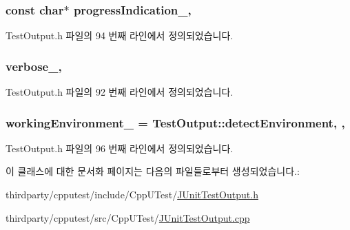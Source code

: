 \subsubsection[{\texorpdfstring{progress\+Indication\+\_\+}{progressIndication_}}]{\setlength{\rightskip}{0pt plus 5cm}const char$\ast$ progress\+Indication\+\_\+\hspace{0.3cm}{\ttfamily [protected]}, {\ttfamily [inherited]}}\hypertarget{class_test_output_a4cbc8ea3886624399ab3879767d4f018}{}\label{class_test_output_a4cbc8ea3886624399ab3879767d4f018}


Test\+Output.\+h 파일의 94 번째 라인에서 정의되었습니다.

\subsubsection[{\texorpdfstring{verbose\+\_\+}{verbose_}}]{ verbose\+\_\+\hspace{0.3cm}{\ttfamily [protected]}, {\ttfamily [inherited]}}\hypertarget{class_test_output_a86126da532c138842a42d8e9a52b0806}{}\label{class_test_output_a86126da532c138842a42d8e9a52b0806}


Test\+Output.\+h 파일의 92 번째 라인에서 정의되었습니다.

\subsubsection[{\texorpdfstring{working\+Environment\+\_\+}{workingEnvironment_}}]{ working\+Environment\+\_\+ = {\bf Test\+Output\+::detect\+Environment}\hspace{0.3cm}{\ttfamily [static]}, {\ttfamily [protected]}, {\ttfamily [inherited]}}\hypertarget{class_test_output_a8b622cfce4b95599cd31b61a777d68ef}{}\label{class_test_output_a8b622cfce4b95599cd31b61a777d68ef}


Test\+Output.\+h 파일의 96 번째 라인에서 정의되었습니다.



이 클래스에 대한 문서화 페이지는 다음의 파일들로부터 생성되었습니다.\+:\begin{DoxyCompactItemize}
\item 
thirdparty/cpputest/include/\+Cpp\+U\+Test/\hyperlink{_j_unit_test_output_8h}{J\+Unit\+Test\+Output.\+h}\item 
thirdparty/cpputest/src/\+Cpp\+U\+Test/\hyperlink{_j_unit_test_output_8cpp}{J\+Unit\+Test\+Output.\+cpp}\end{DoxyCompactItemize}
